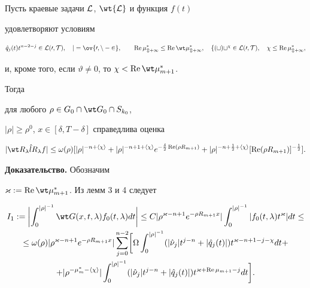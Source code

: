 \begin{lem}


Пусть краевые задачи $\cal L$, $\wt{\cal L}$ и функция $f(t)$


удовлетворяют условиям


$$


\Hat q_j(t)t^{n-2-j}\in\cal L(0,T),\quad j=\ov{0,n-2},\qquad


\re\mu^*_{m+1}\le\re\wt\mu^*_{m+1},\quad


f(t)t^\chi\in\cal L(0,T),\quad \chi\le\re\mu^*_{m+1},


$$


и, кроме того, если $\vartheta\ne 0$, то $\chi<\re\wt\mu^*_{m+1}$.


Тогда


для любого $\rho\in G_0\cap\wt G_0\cap S_{k_0}$,


$|\rho|\ge\rho^0$, $x\in[\delta,T-\delta]$ справедлива оценка


$$


|\wt R_\lambda\Hat l R_\lambda f|\le\omega(\rho)


[|\rho|^{-n+\la\chi\ra}+|\rho|^{-n+1+\la\chi\ra}


e^{-\frac{\delta}{2}\re(\rho R_{m+1})}+


|\rho|^{-n+\frac{1}{2}+\la\chi\ra}


[\re(\rho R_{m+1})]^{-\frac{1}{2}}].


$$


\end{lem}





{\bf Доказательство.} Обозначим


$\varkappa:=\re\wt\mu^*_{m+1}$. Из лемм 3 и 4 следует


\begin{multline*}


I_1:=\biggl|\int^{|\rho|^{-1}}_0\wt G(x,t,\lambda)


f_0(t,\lambda)dt\biggr|\le


C|\rho^{\varkappa-n+1}e^{-\rho R_{m+1}x}|


\int^{|\rho|^{-1}}_0 |f_0(t,\lambda)t^\varkappa|dt\le \\


\le\omega(\rho)|\rho^{\varkappa-n+1}


e^{-\rho R_{m+1}x}|\sum^{n-2}_{j=0}\biggl[ \Omega


\int^{|\rho|^{-1}}_0(|\Hat\nu_j|t^{j-n}+|\Hat q_j(t)|)


t^{\varkappa-n+1-j-\chi}dt +\\


+|\rho^{-\mu^*_m-\la\chi\ra}|\int^{|\rho|^{-1}}_0


(|\Hat\nu_j|t^{j-n}+|\Hat q_j(t)|)


t^{\varkappa+\re\mu_{m+1}-j}dt\biggr].


\end{multline*}





